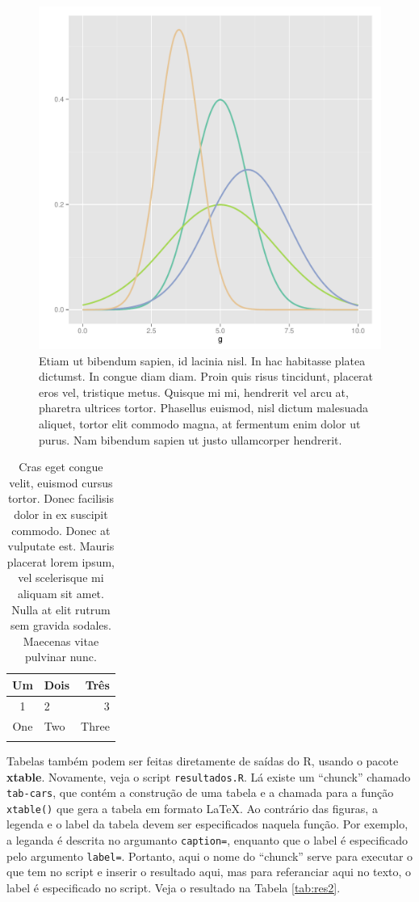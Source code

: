 \documentclass[book,A4paper,10pt,twoside,oldfontcommands]{memoir}\usepackage[]{graphicx}\usepackage[usenames,dvipsnames]{color}
\newenvironment{knitrout}{}{} %
\begin{document}
\begin{btUnit}
\begin{knitrout}
\color{fgcolor}\begin{figure}[htb]

{\centering \includegraphics[width=0.45\linewidth]{figuras/distributions} 

}

\caption[Etiam ut bibendum sapien, id lacinia nisl]{Etiam ut bibendum sapien, id lacinia nisl. In hac habitasse platea dictumst. In congue diam diam. Proin quis risus tincidunt, placerat eros vel, tristique metus. Quisque mi mi, hendrerit vel arcu at, pharetra ultrices tortor. Phasellus euismod, nisl dictum malesuada aliquet, tortor elit commodo magna, at fermentum enim dolor ut purus. Nam bibendum sapien ut justo ullamcorper hendrerit.}\label{fig:fig4}
\end{figure}


\end{knitrout}


\begin{table}
\centering
\caption{Cras eget congue velit, euismod cursus tortor. Donec
  facilisis dolor in ex suscipit commodo. Donec at vulputate est.
  Mauris placerat lorem ipsum, vel scelerisque mi aliquam sit amet.
  Nulla at elit rutrum sem gravida sodales. Maecenas vitae pulvinar
  nunc.}
\begin{tabular}{clr}
\hline
Um & Dois & Três\\
\hline
1 & 2 & 3 \\
One & Two & Three\\
\hline
\label{Tab:result}
\end{tabular}
\end{table}

Tabelas também podem ser feitas diretamente de saídas do R, usando o
pacote \textbf{xtable}. Novamente, veja o script \texttt{resultados.R}.
Lá existe um ``chunck'' chamado \texttt{tab-cars}, que contém a
construção de uma tabela e a chamada para a função \texttt{xtable()} que
gera a tabela em formato \LaTeX. Ao contrário das figuras, a legenda e o
label da tabela devem ser especificados naquela função. Por exemplo, a
leganda é descrita no argumanto \texttt{caption=}, enquanto que o label
é especificado pelo argumento \texttt{label=}. Portanto, aqui o nome do
``chunck'' serve para executar o que tem no script e inserir o resultado
aqui, mas para referanciar aqui no texto, o label é especificado no
script. Veja o resultado na Tabela \ref{tab:res2}.


\end{btUnit}
\end{document}
